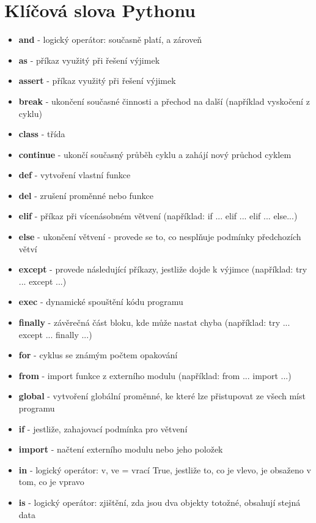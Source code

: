 \documentclass[12pt,a4paper]{article}
\begin{document}
\section{Klíčová slova Pythonu}
\begin{itemize}
    \item \textbf{and} - logický operátor: současně platí, a zároveň
    \item \textbf{as} - příkaz využitý při řešení výjimek
    \item \textbf{assert} - příkaz využitý při řešení výjimek
    \item \textbf{break} - ukončení současné činnosti a přechod na další (například vyskočení z cyklu)
    \item \textbf{class} - třída
    \item \textbf{continue} - ukončí současný průběh cyklu a zahájí nový průchod cyklem
    \item \textbf{def} - vytvoření vlastní funkce
    \item \textbf{del} - zrušení proměnné nebo funkce
    \item \textbf{elif} - příkaz při vícenásobném větvení (například: if ... elif ... elif ... else...)
    \item \textbf{else} - ukončení větvení - provede se to, co nesplňuje podmínky předchozích větví
    \item \textbf{except} - provede následující příkazy, jestliže dojde k výjimce (například: try ... except ...)
    \item \textbf{exec} - dynamické spouštění kódu programu
    \item \textbf{finally} - závěrečná část bloku, kde může nastat chyba (například: try ... except ... finally ...)
    \item \textbf{for} - cyklus se známým počtem opakování
    \item \textbf{from} - import funkce z externího modulu (například: from ... import ...)
    \item \textbf{global} - vytvoření globální proměnné, ke které lze přistupovat ze všech míst programu
    \item \textbf{if} - jestliže, zahajovací podmínka pro větvení
    \item \textbf{import} - načtení externího modulu nebo jeho položek
    \item \textbf{in} - logický operátor: v, ve = vrací True, jestliže to, co je vlevo, je obsaženo v tom, co je vpravo
    \item \textbf{is} - logický operátor: zjištění, zda jsou dva objekty totožné, obsahují stejná data

\end{itemize}
\end{document}
